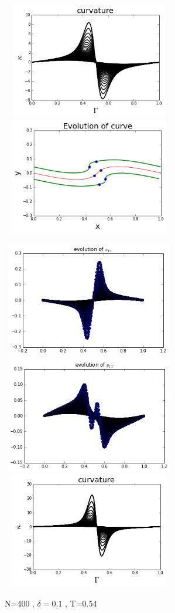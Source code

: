 \documentclass[12pt,twoside]{article}
\begin{document}
\begin{figure}[ht]
\begin{minipage}[b]{0.45\linewidth}
\includegraphics[width=3in,height=2in]{curvatureT054.png}
\includegraphics[width=3in,height=2in]{curveT054.png}
\caption{N=400 , $\delta=0.1$ , T=0.54}
\end{minipage}
\quad
\begin{minipage}[b]{0.45\linewidth}
\includegraphics[width=3in,height=2in]{xppT06.png}
\includegraphics[width=3in,height=2in]{yppT06.png}
\includegraphics[width=3in,height=2in]{curvatureT06.png}

\end{minipage}
\end{figure}
\end{document}
